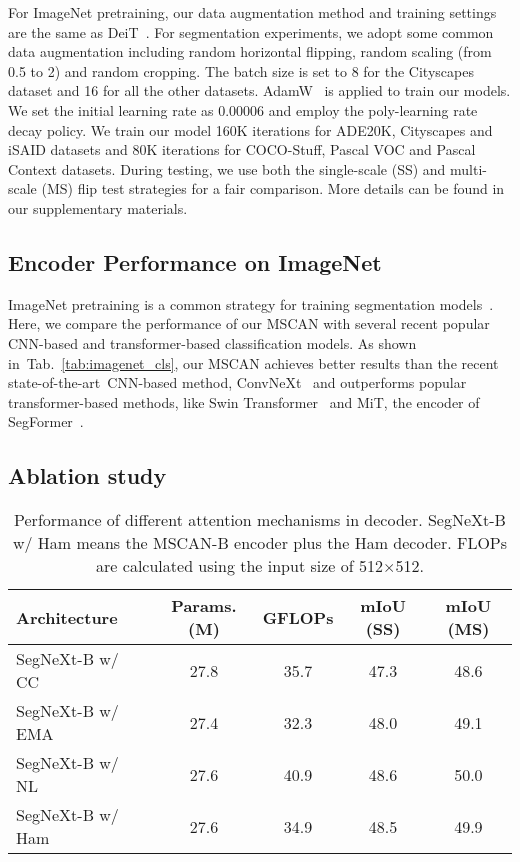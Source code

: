\documentclass{article}
\def\sArt{state-of-the-art~}
\newcommand{\tabref}[1]{Tab.~\ref{#1}}
\begin{document}
For ImageNet pretraining, our data augmentation method and training settings are the same as DeiT~\cite{touvron2021training}.
For segmentation experiments, we adopt some common data augmentation including random horizontal flipping, random scaling (from 0.5 to 2) and random cropping.
The batch size is set to
8 for the Cityscapes dataset and 16 for all the other datasets.
AdamW~\cite{loshchilov2017decoupled} is applied to train our models.
We set the initial learning rate as 0.00006 and employ the poly-learning rate decay policy.
We train our model 160K iterations for ADE20K, Cityscapes and iSAID datasets and 
80K iterations for COCO-Stuff, Pascal VOC and Pascal Context datasets.
During testing, we use both the 
single-scale (SS) and multi-scale (MS) flip test strategies  for a fair comparison.
More details can be found in our supplementary materials.





\subsection{Encoder Performance on ImageNet}
\label{sec:imagenet}

ImageNet pretraining is a common strategy for training segmentation models~\cite{zhao2017pyramid,chen2017rethinking,xie2021segformer,yuan2021hrformer,chen2017deeplab}.
Here, we compare the performance of our MSCAN with several recent popular CNN-based
and transformer-based classification models.
As shown in~\tabref{tab:imagenet_cls}, our MSCAN achieves better results than the recent \sArt CNN-based method, ConvNeXt~\cite{liu2022convnet} and outperforms popular transformer-based methods, like Swin Transformer~\cite{liu2021swin} and MiT, the encoder of SegFormer~\cite{xie2021segformer}.




\subsection{Ablation study}


\begin{table}[t]
    \centering
    \renewcommand{\arraystretch}{1}
    \renewcommand{\tabcolsep}{3mm}
    \caption{Performance of different attention mechanisms in decoder. 
    SegNeXt-B w/ Ham means the MSCAN-B encoder plus the Ham decoder.
    FLOPs are calculated using the input size of 512$\times$512.
    }
    \begin{tabular}{l|cc|cc}
        \toprule
    	Architecture & Params. (M) & GFLOPs & mIoU (SS) & mIoU (MS)  \\ \midrule
    	SegNeXt-B w/ CC~\cite{huang2019ccnet} & 27.8 & 35.7 & 47.3 & 48.6 \\ 
    	SegNeXt-B w/ EMA~\cite{li2019expectation} & 27.4 & 32.3 & 48.0 & 49.1 \\ 
    	SegNeXt-B w/ NL~\cite{wang2018non} & 27.6 & 40.9 & 48.6 & 50.0 \\ 
    	SegNeXt-B w/ Ham~\cite{geng2021attention} & 27.6 & 34.9 & 48.5 & 49.9 \\ 
        \bottomrule
    \end{tabular}
    \label{tab:ablation_decoder}
\end{table}
\end{document}
